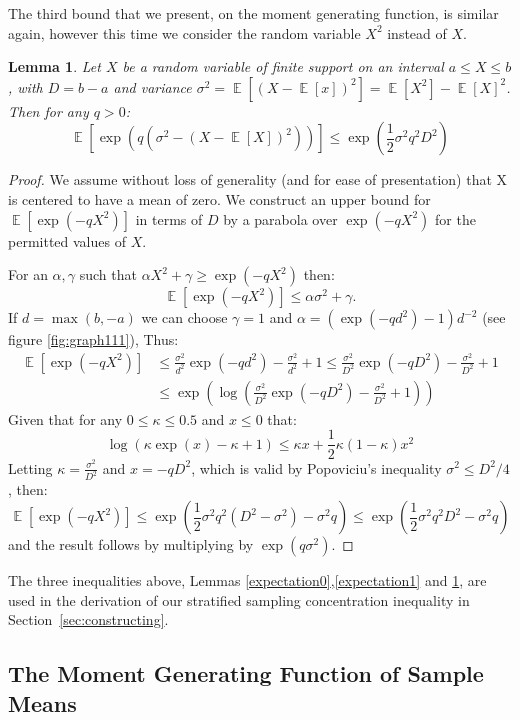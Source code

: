 \documentclass[]{interact}
\DeclareMathOperator{\E}{\mathbb{E}}
\theoremstyle{plain}%
\newtheorem{lemma}[Theorem]{Lemma}
\theoremstyle{definition}
\theoremstyle{remark}
\begin{document}
The third bound that we present, on the moment generating function, is similar again, however this time we consider the random variable $X^2$ instead of $X$. 

\begin{lemma}\label{expectation2}
Let $X$ be a random variable of finite support on an interval $a\le X\le b$, with $D=b-a$ and variance $\sigma^2 = \E[(X-\E[x])^2] = \E[X^2]-\E[X]^2$. Then for any $q>0$:
$$\E[\exp(q(\sigma^2-(X-\E[X])^2))] \le \exp\left(\frac{1}{2}\sigma^2q^2D^2\right)$$
\end{lemma}
\begin{proof}
We assume without loss of generality (and for ease of presentation) that X is centered to have a mean of zero.
We construct an upper bound for $\E\left[\exp(-qX^2)\right]$ in terms of $D$ by a parabola over $\exp(-qX^2)$ for the permitted values of $X$.

For an $\alpha,\gamma$ such that $\alpha X^2+\gamma\ge \exp(-qX^2)$ then:
$$ \E[\exp(-qX^2)] \le \alpha \sigma^2 + \gamma.$$
If $d=\max(b,-a)$ we can choose $\gamma=1$ and $\alpha=(\exp(-q d^2)-1)d^{-2}$ (see figure \ref{fig:graph111}), Thus:
\begin{align*}
\E[\exp(-q X^2)] &\le \frac{\sigma^2}{d^2}\exp(-q d^2)-\frac{\sigma^2}{d^2} + 1\le \frac{\sigma^2}{D^2}\exp(-q D^2)-\frac{\sigma^2}{D^2} + 1 \\
&\le \exp\left(\log\left(\frac{\sigma^2}{D^2}\exp(-q D^2)-\frac{\sigma^2}{D^2} + 1\right)\right)
\end{align*}
Given that for any $0\le \kappa \le 0.5$ and $x\le 0$ that: $$\log\left(\kappa\exp(x)-\kappa + 1\right) \le \kappa x+\frac{1}{2}\kappa(1-\kappa)x^2$$
Letting $\kappa=\frac{\sigma^2}{D^2}$ and $x=-qD^2$, which is valid by Popoviciu's inequality \cite{zbMATH05780164} $\sigma^2\le D^2/4$, then:
$$ \E[\exp(-q X^2)] \le \exp\left(\frac{1}{2}\sigma^2q^2(D^2-\sigma^2)-\sigma^2q\right) \le \exp\left(\frac{1}{2}\sigma^2q^2D^2-\sigma^2q\right)$$
and the result follows by multiplying by $\exp(q\sigma^2)$.
\end{proof}

The three inequalities above, Lemmas \ref{expectation0},\ref{expectation1} and \ref{expectation2}, are used in the derivation of our stratified sampling concentration inequality in Section~\ref{sec:constructing}.

\subsection{The Moment Generating Function of Sample Means}\label{sec:without_replacement}
\end{document}

